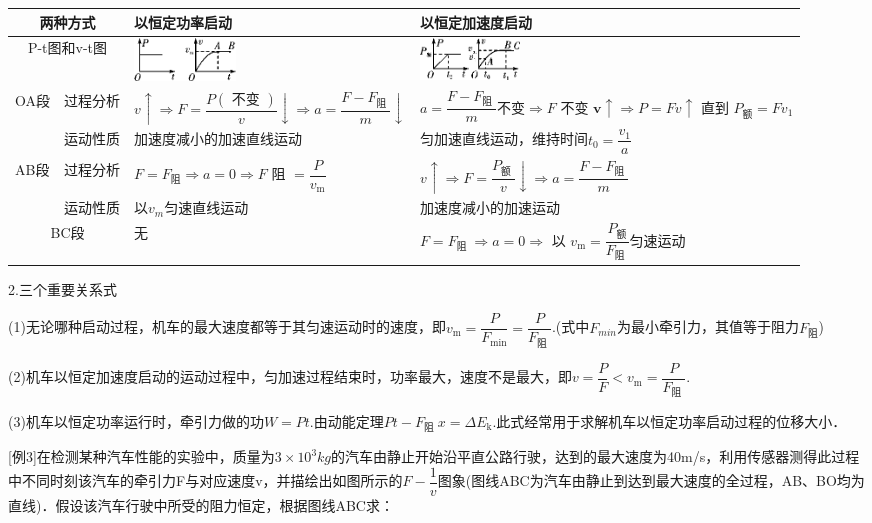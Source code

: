 \begin{longtable}[]{@{}m{1cm}m{1.5cm}m{5.5cm}m{5.3cm}@{}}
\toprule
\multicolumn{2}{c}{两种方式}
 & 以恒定功率启动 & 以恒定加速度启动 \tabularnewline
\midrule
\endhead
\multicolumn{2}{c}{P-t图和v-t图}
 &
\includegraphics[width=1.0625in,height=0.44792in]{media/image210.png} &
\includegraphics[width=1.04167in,height=0.4375in]{media/image211.png}\tabularnewline
\multirow{2}{1cm}{OA段}
&
过程分析 
&
$v \uparrow \Rightarrow F=\dfrac{P(\text { 不变 })}{v} \downarrow \Rightarrow a=\dfrac{F-F_{\text {阻 }}}{m}\downarrow$
&
$a=\dfrac{F-F_{\text {阻 }}}{m}$不变$ \Rightarrow F \text { 不变 } \boldsymbol{v} \uparrow \Rightarrow P=F v \uparrow$ 直到 $P_{\text {额}}=F v_{1}$\tabularnewline
 & 运动性质 & 加速度减小的加速直线运动 &
匀加速直线运动，维持时间$t_{0}=\dfrac{v_{1}}{a}$\tabularnewline
\multirow{2}{1cm}{AB段 }
& 过程分析 & $F=F_{\text {阻}} \Rightarrow a=0 \Rightarrow F$ 阻 $=\dfrac{P}{v_{\mathrm{m}}}$ & $v \uparrow \Rightarrow F=\dfrac{P_{\text {额 }}}{v} \downarrow \Rightarrow a=\dfrac{F-F_{\text {阻 }}}{m}$\tabularnewline
& 运动性质 & 以$v_m$匀速直线运动 & 加速度减小的加速运动\tabularnewline
\multicolumn{2}{c}{BC段} & 无 & $F=F_{\text {阻 }} \Rightarrow a=0 \Rightarrow$ 以 $v_{\mathrm{m}}=\dfrac{P_{\text {额}}}{F_{\text {阻 }}}$匀速运动\tabularnewline
\bottomrule
\end{longtable}

2.三个重要关系式

(1)无论哪种启动过程，机车的最大速度都等于其匀速运动时的速度，即$v_{\mathrm{m}}=\dfrac{P}{F_{\min }}=\dfrac{P}{F_{\text {阻 }}}$.(式中$F_{min}$为最小牵引力，其值等于阻力$F_{\text{阻}}$)

(2)机车以恒定加速度启动的运动过程中，匀加速过程结束时，功率最大，速度不是最大，即$v=\dfrac{P}{F}<v_{\mathrm{m}}=\dfrac{P}{F_{\text {阻 }}}$.

(3)机车以恒定功率运行时，牵引力做的功$W=Pt$.由动能定理$P t-F_{\text {阻 }}x=\Delta E_{\mathrm{k}}$.此式经常用于求解机车以恒定功率启动过程的位移大小．

{[}例3{]}在检测某种汽车性能的实验中，质量为$3\times 10^3kg$的汽车由静止开始沿平直公路行驶，达到的最大速度为40m/s，利用传感器测得此过程中不同时刻该汽车的牵引力F与对应速度v，并描绘出如图所示的$F-\dfrac{1}{v}$图象(图线ABC为汽车由静止到达到最大速度的全过程，AB、BO均为直线)．假设该汽车行驶中所受的阻力恒定，根据图线ABC求：

